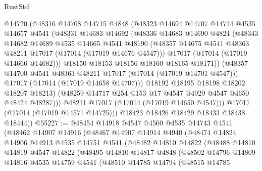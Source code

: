 \begin{lexlean}{RustStd}
\begin{coremodule}
                @14720
                (@48316
                  @14708
                  @14715
                  @4848
                  (@48323
                    @14694
                    @14707
                    @14714
                    @4535
                    @14657
                    @4541
                    (@48331
                      @14683
                      @14692
                      (@48336
                        @14683
                        @14690
                        @4824
                        (@48343
                          @14682
                          @14689
                          @4535
                          @14665
                          @4541
                          @48190
                          (@48357 @14675 @4541 @48363 @48211 @17017 (@17014 (@17019 @14676 @4547)))
                          @17017
                          (@17014 (@17019 @14666 @14682)))
                        @18150
                        @18153
                        @18156
                        @18160
                        @18165
                        @18171))
                    (@48357 @14700 @4541 @48363 @48211 @17017 (@17014 (@17019 @14701 @4547)))
                    @17017
                    (@17014 (@17019 @14658 @14707)))
                  @18192
                  @18195
                  @18198
                  @18202
                  @18207
                  @18213)
                (@48259 @14717 @254 @153 @17 @4547 @4929 @4547 @4650 @48424 @48287)))
            @48211
            @17017
            (@17014 (@17019 @14650 @4547)))
          @17017
          (@17014 (@17019 @14571 @14725)))
        @18423
        @18426
        @18429
        @18433
        @18438
        @18444))
@55227 := @48454
    @14918
    @4547
    @4560
    @4535
    @14743
    @4541
    (@48462
      @14907
      @14916
      (@48467
        @14907
        @14914
        @4940
        (@48474
          @14824
          @14906
          @14913
          @4535
          @14751
          @4541
          (@48482
            @14810
            @14822
            (@48488
              @14810
              @14819
              @4547
              @14822
              (@48495
                @14810
                @14817
                @4848
                (@48502
                  @14796
                  @14809
                  @14816
                  @4535
                  @14759
                  @4541
                  (@48510
                    @14785
                    @14794
                    (@48515
                      @14785

\end{coremodule}
\end{lexlean}
